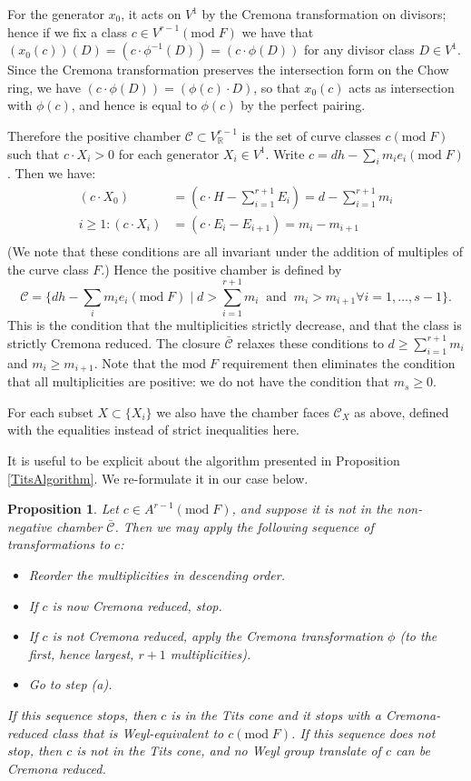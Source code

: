 \documentclass[12pt]{article}
\numberwithin{equation}{section}
\newtheorem{proposition}[equation]{Proposition}
\numberwithin{equation}{section}
\numberwithin{subeq}{equation}
\def\bbR{\mathbb{R}}
\def\mod{\text{mod}\;}
\begin{document}
For the generator $x_0$, it acts on $V^{1}$ by the Cremona transformation on divisors;
hence if we fix a class $c \in V^{r-1} (\mod F)$ we have that $(x_0(c))(D) = (c \cdot \phi^{-1}(D)) = (c \cdot \phi(D))$
for any divisor class $D \in V^1$.
Since the Cremona transformation preserves the intersection form on the Chow ring, we have
$(c \cdot \phi(D)) = (\phi(c) \cdot D)$,
so that $x_0(c)$ acts as intersection with $\phi(c)$,
and hence is equal to $\phi(c)$ by the perfect pairing.

Therefore the positive chamber $\mathcal{C} \subset V^{r-1}_\bbR$ is the set of curve classes $c (\mod F)$
such that $c \cdot X_i > 0$ for each generator $X_i \in V^1$.
Write $c = dh - \sum_i m_i e_i (\mod F)$.
Then we have:
\begin{align*}
(c \cdot X_0) &= (c \cdot H-\sum_{i=1}^{r+1}E_i) = d-\sum_{i=1}^{r+1}m_i \\
i \geq 1: (c \cdot X_i) &= (c \cdot E_i-E_{i+1}) = m_{i} - m_{i+1} \\
\end{align*}
(We note that these conditions are all invariant under the addition of multiples of the curve class $F$.)
Hence the positive chamber is defined by
\[
\mathcal{C} = \{dh-\sum_i m_i e_i (\mod F) \;|\; d > \sum_{i=1}^{r+1} m_i \;\;\text{and}\;\; m_i > m_{i+1} \forall i = 1,\ldots,s-1\}.
\]
This is the condition that the multiplicities strictly decrease, and that the class is strictly Cremona reduced.
The closure $\bar{\mathcal{C}}$ relaxes these conditions to $d \geq \sum_{i=1}^{r+1}m_i$ and $m_i\geq m_{i+1}$.
Note that the $\mod F$ requirement then eliminates the condition that all multiplicities are positive:
we do not have the condition that $m_s\geq 0$.

For each subset $X \subset \{X_i\}$ we also have the chamber faces $\mathcal{C}_X$ as above,
defined with the equalities instead of strict inequalities here.

It is useful to be explicit about the algorithm presented in Proposition \ref{TitsAlgorithm}.
We re-formulate it in our case below.

\begin{proposition}\label{cremonareduction}
Let $c \in A^{r-1}(\mod F)$, and suppose it is not in the non-negative chamber $\bar{\mathcal{C}}$.
Then we may apply the following sequence of transformations to $c$:
\begin{itemize}
\item[(a)] Reorder the multiplicities in descending order.
\item[(b)] If $c$ is now Cremona reduced, stop.
\item[(c)] If $c$ is not Cremona reduced,
apply the Cremona transformation $\phi$ (to the first, hence largest, $r+1$ multiplicities).
\item[(d)] Go to step (a).
\end{itemize}
If this sequence stops, then $c$ is in the Tits cone
and it stops with a Cremona-reduced class that is Weyl-equivalent to $c (\mod F)$.
If this sequence does not stop, then $c$ is not in the Tits cone,
and no Weyl group translate of $c$ can be Cremona reduced.
\end{proposition}
\end{document}
